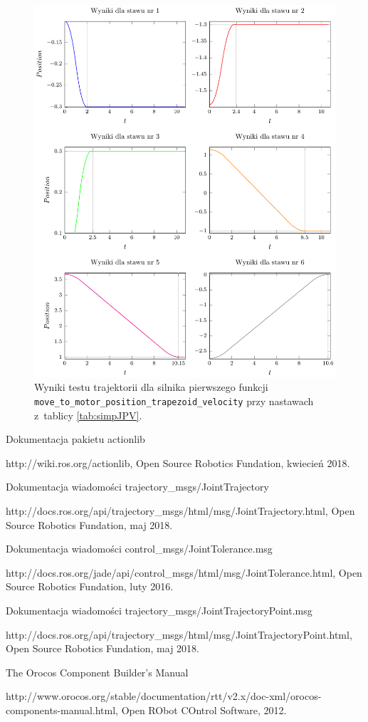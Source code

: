 \documentclass[a4paper, 12pt]{article}
\begin{document}
	\begin{figure}[H]
		\centering
		\includegraphics[scale=1.1]{raport_graphs/simpJPVall.pdf}
		\caption{Wyniki testu trajektorii dla silnika pierwszego funkcji \texttt{move\_to\_motor\_position\_trapezoid\_velocity} przy nastawach z~tablicy \ref{tab:simpJPV}.}
		\label{fig:simpJPVall}
	\end{figure}
	
	
\newpage	
\begin{thebibliography}{9}
Dokumentacja pakietu actionlib

http://wiki.ros.org/actionlib, Open Source Robotics Fundation, kwiecień 2018.

Dokumentacja wiadomości trajectory\_msgs/JointTrajectory

http://docs.ros.org/api/trajectory\_msgs/html/msg/JointTrajectory.html, Open Source Robotics Fundation, maj 2018.

Dokumentacja wiadomości control\_msgs/JointTolerance.msg

http://docs.ros.org/jade/api/control\_msgs/html/msg/JointTolerance.html, Open Source Robotics Fundation, luty 2016.

Dokumentacja wiadomości trajectory\_msgs/JointTrajectoryPoint.msg

http://docs.ros.org/api/trajectory\_msgs/html/msg/JointTrajectoryPoint.html, Open Source Robotics Fundation, maj 2018.

The Orocos Component Builder's Manual

 http://www.orocos.org/stable/documentation/rtt/v2.x/doc-xml/orocos-components-manual.html, Open RObot COntrol Software, 2012.
\end{thebibliography}	
	
\end{document}
